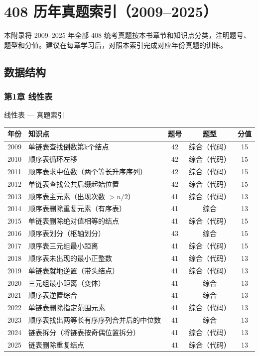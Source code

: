 
\chapter{408 历年真题索引（2009--2025）}

\noindent 本附录将 2009--2025 年全部 408 统考真题按本书章节和知识点分类，注明题号、题型和分值。建议在每章学习后，对照本索引完成对应年份真题的训练。

\section{数据结构}

\subsection*{第1章 线性表}

\begin{tablebox}{线性表 — 真题索引}
\centering
\begin{tabular}{|c|l|c|c|c|}
\hline
年份 & 知识点 & 题号 & 题型 & 分值 \\
\hline
2009 & 单链表查找倒数第k个结点 & 42 & 综合（代码）& 15 \\
2010 & 顺序表循环左移 & 42 & 综合（代码）& 15 \\
2011 & 顺序表求中位数（两个等长升序序列）& 42 & 综合（代码）& 15 \\
2012 & 单链表查找公共后缀起始位置 & 42 & 综合（代码）& 15 \\
2013 & 顺序表主元素（出现次数 $>n/2$）& 41 & 综合（代码）& 13 \\
2014 & 顺序表删除重复元素（有序表）& 41 & 综合 & 13 \\
2015 & 单链表删除绝对值相等的结点 & 41 & 综合（代码）& 15 \\
2016 & 顺序表划分（枢轴划分）& 43 & 综合 & 15 \\
2017 & 顺序表三元组最小距离 & 41 & 综合（代码）& 15 \\
2018 & 顺序表未出现的最小正整数 & 41 & 综合（代码）& 13 \\
2019 & 单链表就地逆置（带头结点）& 41 & 综合（代码）& 13 \\
2020 & 三元组最小距离（变体）& 41 & 综合 & 13 \\
2021 & 顺序表逆置综合 & 41 & 综合 & 13 \\
2022 & 单链表删除指定范围元素 & 41 & 综合（代码）& 13 \\
2023 & 顺序表找出两等长有序序列合并后的中位数 & 41 & 综合 & 13 \\
2024 & 链表拆分（将链表按奇偶位置拆分）& 41 & 综合（代码）& 13 \\
2025 & 链表删除重复结点 & 41 & 综合（代码）& 13 \\
\hline
\end{tabular}
\end{tablebox}

